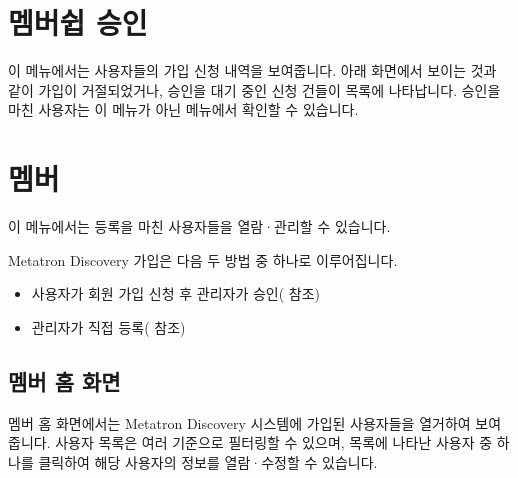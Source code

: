 \documentclass[letterpaper,10pt,english]{sphinxmanual}
\begin{document}
\section{멤버쉽 승인}
\label{\detokenize{discovery/part08/membership_approval:membership-approval}}\label{\detokenize{discovery/part08/membership_approval:id1}}\label{\detokenize{discovery/part08/membership_approval::doc}}
이 메뉴에서는 사용자들의 가입 신청 내역을 보여줍니다. 아래 화면에서 보이는 것과 같이 가입이 거절되었거나, 승인을 대기 중인 신청 건들이 목록에 나타납니다. 승인을 마친 사용자는 이 메뉴가 아닌  메뉴에서 확인할 수 있습니다.
\begin{quote}

\begin{figure}[H]
\centering

\noindent{}
\end{figure}
\end{quote}


\section{멤버}
\label{\detokenize{discovery/part08/members:id1}}\label{\detokenize{discovery/part08/members::doc}}
이 메뉴에서는 등록을 마친 사용자들을 열람·관리할 수 있습니다.

Metatron Discovery 가입은 다음 두 방법 중 하나로 이루어집니다.
\begin{itemize}
\item {} 
사용자가 회원 가입 신청 후 관리자가 승인({\hyperref[\detokenize{discovery/part08/membership_approval:membership-approval}]{}} 참조)

\item {} 
관리자가 직접 등록({\hyperref[\detokenize{discovery/part08/members:user-registration}]{}} 참조)

\end{itemize}


\subsection{멤버 홈 화면}
\label{\detokenize{discovery/part08/members:id2}}
멤버 홈 화면에서는 Metatron Discovery 시스템에 가입된 사용자들을 열거하여 보여줍니다.
사용자 목록은 여러 기준으로 필터링할 수 있으며, 목록에 나타난 사용자 중 하나를 클릭하여 해당 사용자의 정보를 열람·수정할 수 있습니다.
\begin{quote}

\begin{figure}[H]
\centering

\noindent{}
\end{figure}
\end{quote}
\end{document}
